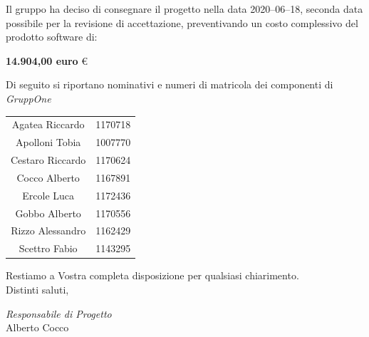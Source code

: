\documentclass{article}
\begin{document}
Il gruppo ha deciso di consegnare il progetto nella data 2020--06--18, seconda data possibile per la revisione di accettazione, preventivando un costo complessivo del prodotto software di:
\begin{center}
  \textbf{14.904,00 euro} €
\end{center}
\newpage
Di seguito si riportano nominativi e numeri di matricola dei componenti di \textit{GruppOne}

\renewcommand{\arraystretch}{2}
\begin{longtable}[H]{c|c}
  \rowcolor{darkgray!90!}
  \color{white}{\textbf{Nominativo}} & \color{white}{\textbf{Matricola}} \\
  \endhead%
  Agatea Riccardo                    & 1170718                           \\
  Apolloni Tobia                     & 1007770                           \\
  Cestaro Riccardo                   & 1170624                           \\
  Cocco Alberto                      & 1167891                           \\
  Ercole Luca                        & 1172436                           \\
  Gobbo Alberto                      & 1170556                           \\
  Rizzo Alessandro                   & 1162429                           \\
  Scettro Fabio                      & 1143295
\end{longtable}

Restiamo a Vostra completa disposizione per qualsiasi chiarimento.\\
Distinti saluti,

\hspace{2cm}
\begin{adjustwidth}{2.5cm}{10.5cm}
  \centering
  \textit{Responsabile di Progetto}\\
  Alberto Cocco\
  \hspace{2cm}
  \underline{} %
\end{adjustwidth}
\end{document}
